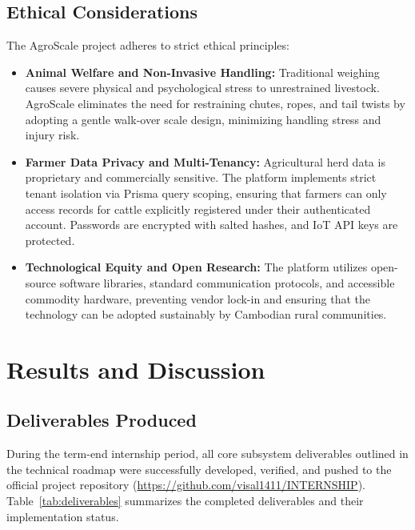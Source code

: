 \documentclass[11pt,a4paper]{report}
\begin{document}
\section{Ethical Considerations}
The AgroScale project adheres to strict ethical principles:
\begin{itemize}
    \item \textbf{Animal Welfare and Non-Invasive Handling:} Traditional weighing causes severe physical and psychological stress to unrestrained livestock. AgroScale eliminates the need for restraining chutes, ropes, and tail twists by adopting a gentle walk-over scale design, minimizing handling stress and injury risk.
    \item \textbf{Farmer Data Privacy and Multi-Tenancy:} Agricultural herd data is proprietary and commercially sensitive. The platform implements strict tenant isolation via Prisma query scoping, ensuring that farmers can only access records for cattle explicitly registered under their authenticated account. Passwords are encrypted with salted hashes, and IoT API keys are protected.
    \item \textbf{Technological Equity and Open Research:} The platform utilizes open-source software libraries, standard communication protocols, and accessible commodity hardware, preventing vendor lock-in and ensuring that the technology can be adopted sustainably by Cambodian rural communities.
\end{itemize}

\clearpage

\chapter{Results and Discussion}

\section{Deliverables Produced}
During the term-end internship period, all core subsystem deliverables outlined in the technical roadmap were successfully developed, verified, and pushed to the official project repository (\url{https://github.com/visal1411/INTERNSHIP}). Table~\ref{tab:deliverables} summarizes the completed deliverables and their implementation status.
\end{document}

